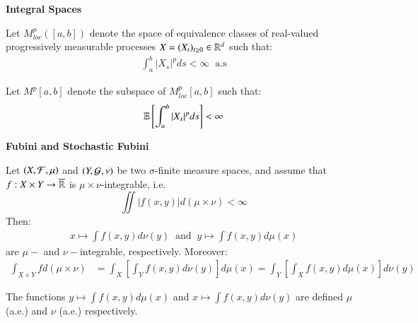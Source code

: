 \centerline{\textbf{Integral Spaces}}

\begin{definition}[$M^{p}_{loc}$]
Let $M_{loc}^{p}([a,b])$ denote the space of equivalence classes of real-valued progressively measurable processes $X = (X_{t})_{t\geq 0} \in \mathbb{R}^{d}$ such that: 
\begin{align*}
\int_{a}^{b}|X_{s}|^{p}ds < \infty \;\; \text{a.s}  
\end{align*}
\end{definition}

\begin{definition}[$M^{p}$]
Let $M^{p}[a,b]$ denote the subspace of $M^{p}_{loc}[a,b]$ such that: 
\begin{align*}
\mathbb{E}\left[
\int_{a}^{b}|X_{s}|^{p}ds
\right] < \infty   
\end{align*}
\end{definition}

\newpage 
\centerline{\textbf{Fubini and Stochastic Fubini}}
\label{thm: Fubini}
\begin{theorem}
Let $(X, \mathcal{F}, \mu)$ and $(Y, \mathcal{G}, \nu)$ be two $\sigma$-finite measure spaces, and assume that $f:X\times Y \to \overline{\mathbb{R}}$ is $\mu\times\nu$-integrable, i.e. 
\[
\iint |f(x,y)|d(\mu\times \nu) < \infty
\]
Then: 
\begin{align*}
x \mapsto \int f(x,y)d\nu(y) \;\;\text{and}\;\; y\mapsto \int f(x,y)d\mu(x)    
\end{align*}
are $\mu-$ and $\nu-$integrable, respectively. Moreover:
\begin{align*}
\int_{X\times Y} f d(\mu \times \nu) &=     
\int_{X} \left[
\int_{Y} f(x,y)d\nu(y)
\right]d\mu(x) 
= 
\int_{Y} \left[
\int_{X} f(x,y)d\mu(x)
\right]d\nu(y) 
\end{align*}

The functions $y \mapsto \int f(x,y)d\mu(x)$ and $x \mapsto \int f(x,y)d\nu(y)$ are defined $\mu$ (a.e.) and $\nu$ (a.e.) respectively. 
\end{theorem} 

